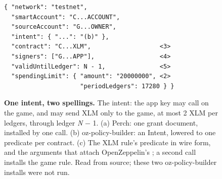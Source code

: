 \begin{figure}[tbp]
\begin{minipage}[t]{0.49\linewidth}
\begin{Verbatim}[fontsize=\scriptsize,frame=single,framesep=1.5mm]
{ "network": "testnet",
  "smartAccount": "C...ACCOUNT",
  "sourceAccount": "G...OWNER",
  "intent": { "...": "(b)" },
  "contract": "C...XLM",                   <3>
  "signers": ["G...APP"],                  <4>
  "validUntilLedger": N - 1,               <5>
  "spendingLimit": { "amount": "20000000", <2>
                     "periodLedgers": 17280 } }
\end{Verbatim}
\end{minipage}
\caption{\textbf{One intent, two spellings.} The intent: the app key may call  on the game, and may send XLM only to the game, at most 2 XLM per  ledgers, through ledger \emph{N} \ensuremath{-} 1. (a) Perch: one grant document, installed by one  call. (b) oz-policy-builder: an Intent, lowered to one predicate per contract. (c) The XLM rule's predicate in wire form, and the  arguments that attach OpenZeppelin's ; a second call installs the game rule. Read from source; these two oz-policy-builder installs were not run.}\label{fig:fig-two-spellings}
\end{figure}
